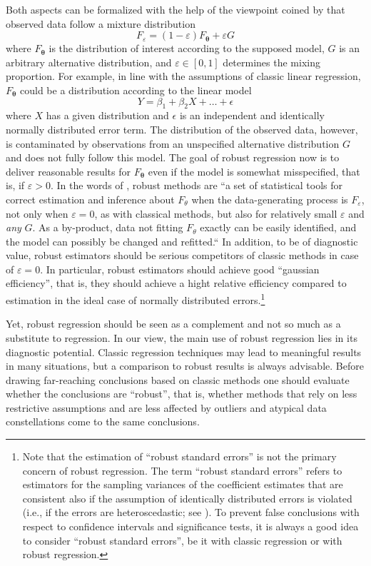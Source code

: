Both aspects can be formalized with the help of the viewpoint coined by 
\citet{huber64} that observed data follow a mixture distribution
\[
    F_\varepsilon = (1 - \varepsilon) F_{\boldsymbol\theta} + \varepsilon G
\]
where $F_{\boldsymbol\theta}$ is the distribution of interest according to the
supposed model, $G$ is an arbitrary alternative distribution, and $\varepsilon
\in [0,1]$ determines the mixing proportion. For example, in line with the
assumptions of classic linear regression, $F_{\boldsymbol\theta}$ could be a
distribution according to the linear model
\[
    Y = \beta_1 + \beta_2 X + \dots + \epsilon
\]
where $X$ has a given distribution and $\epsilon$ is an independent and
identically normally distributed error term. The distribution of the observed
data, however, is contaminated by observations from an unspecified alternative
distribution $G$ and does not fully follow this model. The goal of robust
regression now is to deliver reasonable results for $F_{\boldsymbol\theta}$
even if the model is somewhat misspecified, that is, if $\varepsilon>0$. In the
words of \citet[7]{heritier.etal.09}, robust methods are “a set of statistical
tools for correct estimation and inference about $F_\theta$ when the
data-generating process is $F_\varepsilon$, not only when $\varepsilon=0$, as
with classical methods, but also for relatively small $\varepsilon$ and
\emph{any} $G$. As a by-product, data not fitting $F_\theta$ exactly can be
easily identified, and the model can possibly be changed and refitted.“ In
addition, to be of diagnostic value, robust estimators should be serious
competitors of classic methods in case of $\varepsilon=0$. In particular,
robust estimators should achieve good “gaussian efficiency”, that is, they
should achieve a hight relative efficiency compared to  estimation in
the ideal case of normally distributed errors.\footnote{Note that the
estimation of “robust standard errors” is not the primary concern of robust
regression. The term “robust standard errors” refers to estimators for the
sampling variances of the coefficient estimates that are consistent also if the
assumption of identically distributed errors is violated (i.e., if the errors
are heteroscedastic; see \citealp{white80}). To prevent false conclusions with
respect to confidence intervals and significance tests, it is always a good
idea to consider “robust standard errors”, be it with classic regression or
with robust regression.}

Yet, robust regression should be seen as a complement and not so much as a
substitute to  regression. In our view, the main use of robust
regression lies in its diagnostic potential. Classic regression techniques may
lead to meaningful results in many situations, but a comparison to robust
results is always advisable. Before drawing far-reaching conclusions based on
classic methods one should evaluate whether the conclusions are “robust”, that
is, whether methods that rely on less restrictive assumptions and are less
affected by outliers and atypical data constellations come to the same
conclusions.


